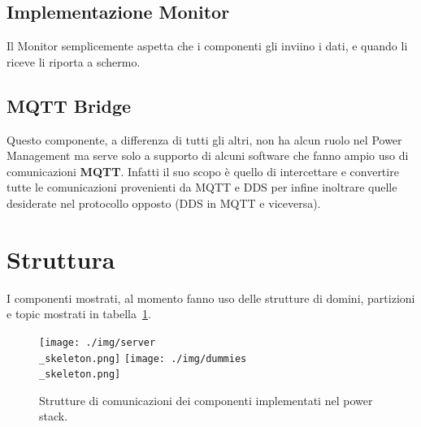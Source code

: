 \subsection*{Implementazione Monitor}
Il Monitor semplicemente aspetta che i componenti gli inviino i dati, e quando li riceve li riporta a schermo.

\subsection*{MQTT Bridge}
Questo componente, a differenza di tutti gli altri, non ha alcun ruolo nel Power Management ma serve solo a supporto di alcuni software che fanno ampio uso di comunicazioni \textbf{MQTT}\cite{mqtt}. Infatti il suo scopo è quello di intercettare e convertire tutte le comunicazioni provenienti da MQTT e DDS per infine inoltrare quelle desiderate nel protocollo opposto (DDS in MQTT e viceversa).%

\section{Struttura}
I componenti mostrati, al momento fanno uso delle strutture di domini, partizioni e topic mostrati in tabella~\ref{fig:dummy_topic}.

\begin{figure}[H]
    \centering
    \texttt{[image: ./img/server\\\_skeleton.png]}
    \texttt{[image: ./img/dummies\\\_skeleton.png]}
    \caption{ Strutture di comunicazioni dei componenti implementati nel power stack.}
    \label{fig:dummy_topic}
\end{figure}
